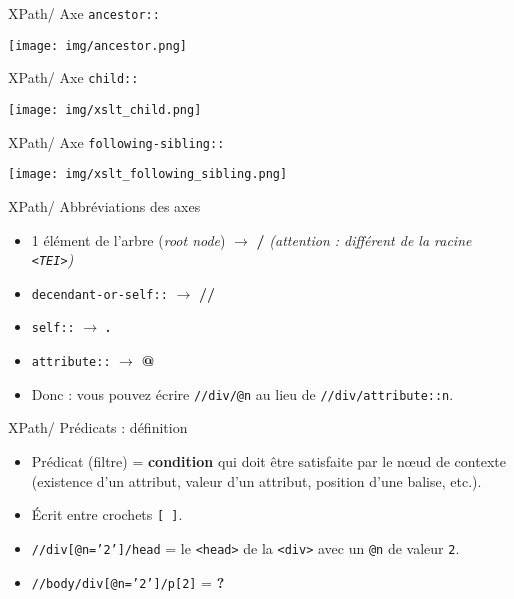 \documentclass{beamer}
\begin{document}
        \begin{frame}{XPath/ Axe \texttt{ancestor::}}
            \begin{center}
                \texttt{[image: img/ancestor.png]}
            \end{center}
        \end{frame}

        \begin{frame}{XPath/ Axe \texttt{child::}}
            \begin{center}
                \texttt{[image: img/xslt\_child.png]}
            \end{center}
        \end{frame}

        \begin{frame}{XPath/ Axe \texttt{following-sibling::}}
            \begin{center}
                \texttt{[image: img/xslt\_following\_sibling.png]}
            \end{center}
        \end{frame}

        \begin{frame}{XPath/ Abbréviations des axes}
        \Large
            \begin{itemize}
                \item 1 élément de l'arbre (\textit{root node}) $\rightarrow$ \textbf{/} \textit{(attention : différent de la racine \texttt{<TEI>})}
                \item \texttt{decendant-or-self::} $\rightarrow$ \textbf{//}
                \item \texttt{self::} $\rightarrow$ \textbf{.}
                \item \texttt{attribute::} $\rightarrow$ \textbf{@}
                \bigskip
                \item Donc : vous pouvez écrire \texttt{//div/@n} au lieu de \texttt{//div/attribute::n}.
            \end{itemize}
        \end{frame}
        
        \begin{frame}{XPath/ Prédicats : définition}
            \Large
            \begin{itemize}
                \item Prédicat (filtre) = \textbf{condition} qui doit être satisfaite par le n\oe ud de contexte (existence d'un attribut, valeur d'un attribut, position d'une balise, etc.).
                \item Écrit entre crochets \texttt{[ ]}.
                \bigskip
                \item \texttt{//div[@n='2']/head} = le \texttt{<head>} de la \texttt{<div>} avec un \texttt{@n} de valeur \texttt{2}.
                \bigskip
                \item \texttt{//body/div[@n='2']/p[2]} = \textbf{?}
            \end{itemize}
        \end{frame}
\end{document}
